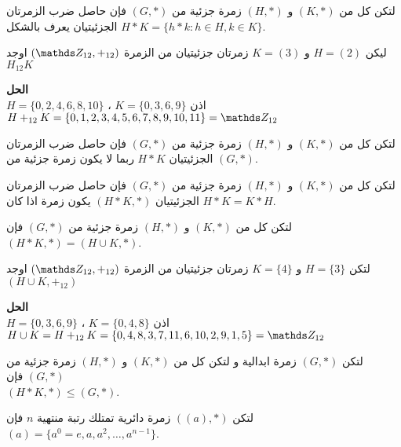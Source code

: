 \begin{definition}
	لتكن كل من $(K, *)$ و $(H, *)$ زمرة جزئية من $(G, *)$ فإن حاصل ضرب الزمرتان الجزئيتيان يعرف بالشكل
	$
	H * K = \{h * k : h \in H, k \in K\}
	$.
\end{definition}

\begin{example}
	ليكن $H=(2)$ و $K=(3)$ زمرتان جزئيتيان من الزمرة $(\Z_{12}, +_{12})$ اوجد $H_{12}K$
\end{example}
\noindent
\textbf{الحل}\\
\noindent
$H=\{0,2,4,6,8,10\}$ ، $K=\{0,3,6,9\}$ اذن\\
 $H+_{12} K=\{0,1,2,3,4,5,6,7,8,9,10,11\} = \Z_{12}$
 
 \begin{note}
 		لتكن كل من $(K, *)$ و $(H, *)$ زمرة جزئية من $(G, *)$ فإن حاصل ضرب الزمرتان الجزئيتيان $H*K$ ربما لا يكون زمرة جزئية من $(G,*)$.
 \end{note}
 
 \begin{theorem}
 		لتكن كل من $(K, *)$ و $(H, *)$ زمرة جزئية من $(G, *)$ فإن حاصل ضرب الزمرتان الجزئيتيان $(H*K, *)$ يكون زمرة اذا كان $H*K=K*H$.
 \end{theorem}
 
 \begin{note}
 		لتكن كل من $(K, *)$ و $(H, *)$ زمرة جزئية من $(G, *)$ فإن $(H*K, *) = (H\cup K, *)$.
 \end{note}
 
 \begin{example}
 	لتكن $H=\{3\}$  و $K=\{4\}$ زمرتان جزئيتيان من الزمرة $(\Z_{12}, +_{12})$ اوجد 
 	$(H\cup K, +_{12})$
 \end{example}
 \noindent
 \textbf{الحل}\\
 \noindent
 $H = \{0,3,6,9\}$ ، $K=\{0,4,8\} $ اذن \\
 $H \cup K = H+_{12} K = \{0,4,8,3,7,11,6,10,2,9,1,5\} = \Z_{12}$

 \begin{theorem}
 	لتكن $(G, *)$ زمرة ابدالية و	لتكن كل من $(K, *)$ و $(H, *)$ زمرة جزئية من $(G, *)$ فإن\\
 	 $(H*K, *) \leq (G, *)$.
 \end{theorem}
 
 \begin{theorem}
 	لتكن $((a), *)$ زمرة دائرية تمتلك رتبة منتهية $n$ فإن 
 	$(a) = \{a^0 = e, a, a^2, \dots, a^{n-1}\}$.
 \end{theorem}
 
